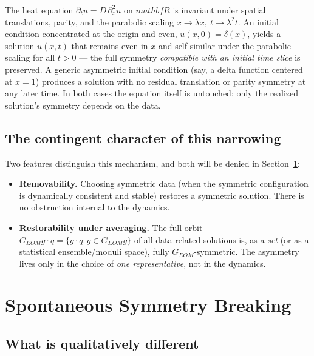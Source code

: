 \begin{example}
The heat equation $\partial_t u = D\,\partial_x^2 u$ on $mathbf R$ is invariant
    under spatial translations, parity, and the parabolic scaling $x\to\lambda
    x,\ t\to\lambda^2 t$. An initial condition concentrated at the origin and
    even, $u(x,0)=\delta(x)$, yields a solution $u(x,t)$ that remains even in
    $x$ and self-similar under the parabolic scaling for all $t>0$ — the full
    symmetry \emph{compatible with an initial time slice} is preserved. A
    generic asymmetric initial condition (say, a delta function centered at
    $x=1$) produces a solution with no residual translation or parity symmetry
    at any later time. In both cases the equation itself is untouched; only the
    realized solution's symmetry depends on the data.
\end{example}

\subsection{The contingent character of this narrowing}

Two features distinguish this mechanism, and both will be denied in Section~\ref{sec:SSB}:
\begin{itemize}
\item \textbf{Removability.} Choosing symmetric data (when the symmetric
    configuration is dynamically consistent and stable) restores a symmetric
        solution. There is no obstruction internal to the dynamics.
\item \textbf{Restorability under averaging.} The full orbit $G_{EOM}g \cdot q
    = \{g\cdot q: g\in G_{EOM}g\}$ of all data-related solutions is, as a
        \emph{set} (or as a statistical ensemble/moduli space), fully
        $G_{EOM}$-symmetric. The asymmetry lives only in the choice of \emph{one
        representative}, not in the dynamics.
\end{itemize}

\section{Spontaneous Symmetry Breaking}
\label{sec:SSB}

\subsection{What is qualitatively different}

